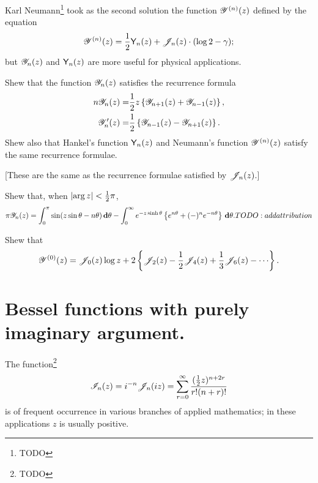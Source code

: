 \documentclass{book}
\begin{document}
Karl Neumann\footnote{TODO} took as the second solution the function
$\mathscr{Y}^{(n)}(z)$ defined by the equation
$$
\mathscr{Y}^{(n)}(z)
=
\frac{1}{2} \mathsf{Y}_n(z) + \mathscr{J}_n(z) \cdot (\log 2 - \gamma);
$$
but $\mathscr{Y}_n(z)$ and $\mathsf{Y}_n(z)$ are more useful for physical
applications.
\begin{wandwexample}
  Shew that the function $\mathscr{Y}_n(z)$ satisfies the recurrence formula
  \begin{align*}
    n \mathscr{Y}_n(z)
    =& \frac{1}{2} z \left\{  \mathscr{Y}_{n+1}(z) + \mathscr{Y}_{n-1}(z) \right\},
    \\
    \mathscr{Y}_n'(z)
    =& \frac{1}{2} \left\{  \mathscr{Y}_{n-1}(z) - \mathscr{Y}_{n+1}(z)   \right\}.
  \end{align*}
  Shew also that Hankel's function $\mathsf{Y}_n(z)$ and Neumann's
  function $\mathscr{Y}^{(n)}(z)$ satisfy the same recurrence formulae.

  [These are the same as the recurrence formulae satisfied by $\mathscr{J}_n(z)$.]
\end{wandwexample}
\begin{wandwexample}
  Shew that, when $\left| \arg z \right| < \frac{1}{2} \pi$,
  $$
  \pi \mathscr{Y}_n(z)
  =
  \int_0^{\pi}
  \sin (z \sin\theta - n\theta) \, \mathbf{d} \theta
  -
  \int_0^{\infty}
  e^{-z \sinh\theta} \left\{ e^{n\theta} + (-)^n e^{-n\theta} \right\} \, \mathbf{d}\theta.
  TODO:addattribution
  $$
\end{wandwexample}
\begin{wandwexample}
  Shew that
  $$
  \besY^{(0)}(z)
  =
  \besJ_0(z) \log z
  + 2 \thebrace{ \besJ_2(z) - \half \besJ_4(z) + \frac{1}{3} \besJ_6(z) - \cdots  }.
  $$
\end{wandwexample}

\section{Bessel functions with purely imaginary argument.}
The function\footnote{TODO}
$$
\mathscr{I}_n(z)
=
i^{-n}
\mathscr{J}_n(iz)
=
\sum_{r=0}^{\infty}
\frac{(\frac{1}{2} z)^{n+2r}}{r!(n+r)!}
$$
% 
% 
is of frequent occurrence in various branches of applied
mathematics; in these applications $z$ is usually positive.
\end{document}
